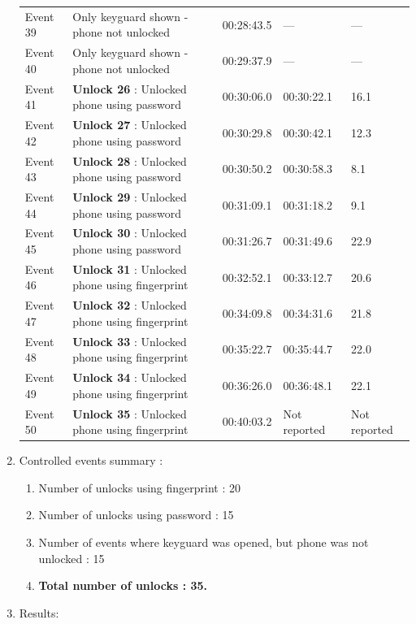 \documentclass{article}
\begin{document}
\begin{enumerate}
\begin{longtable}{p{1.6cm} p{6.4cm} p{3.0cm} p{2.6cm} p{2.2cm}}
        Event 39 & Only keyguard shown - phone not unlocked & 00:28:43.5 & --- & --- \\
        Event 40 & Only keyguard shown - phone not unlocked & 00:29:37.9 & --- & --- \\
        Event 41 & \textbf{Unlock 26} : Unlocked phone using password & 00:30:06.0 & 00:30:22.1 & 16.1 \\
        Event 42 & \textbf{Unlock 27} : Unlocked phone using password & 00:30:29.8 & 00:30:42.1 & 12.3 \\
        Event 43 & \textbf{Unlock 28} : Unlocked phone using password & 00:30:50.2 & 00:30:58.3 & 8.1 \\
        Event 44 & \textbf{Unlock 29} : Unlocked phone using password & 00:31:09.1 & 00:31:18.2 & 9.1 \\
        Event 45 & \textbf{Unlock 30} : Unlocked phone using password & 00:31:26.7 & 00:31:49.6 & 22.9 \\
        Event 46 & \textbf{Unlock 31} : Unlocked phone using fingerprint & 00:32:52.1 & 00:33:12.7 & 20.6 \\
        Event 47 & \textbf{Unlock 32} : Unlocked phone using fingerprint & 00:34:09.8 & 00:34:31.6 & 21.8 \\
        Event 48 & \textbf{Unlock 33} : Unlocked phone using fingerprint & 00:35:22.7 & 00:35:44.7 & 22.0 \\
        Event 49 & \textbf{Unlock 34} : Unlocked phone using fingerprint & 00:36:26.0 & 00:36:48.1 & 22.1 \\
        Event 50 & \textbf{Unlock 35} : Unlocked phone using fingerprint & 00:40:03.2 & Not reported & Not reported \\



    \end{longtable}

    \item Controlled events summary :
    \begin{enumerate}
        \item Number of unlocks using fingerprint : 20
        \item Number of unlocks using password : 15
        \item Number of events where keyguard was opened, but phone was not unlocked : 15
        \item \textbf{Total number of unlocks : 35.}
    \end{enumerate}
    
    \item Results:


\end{enumerate}
\end{document}
